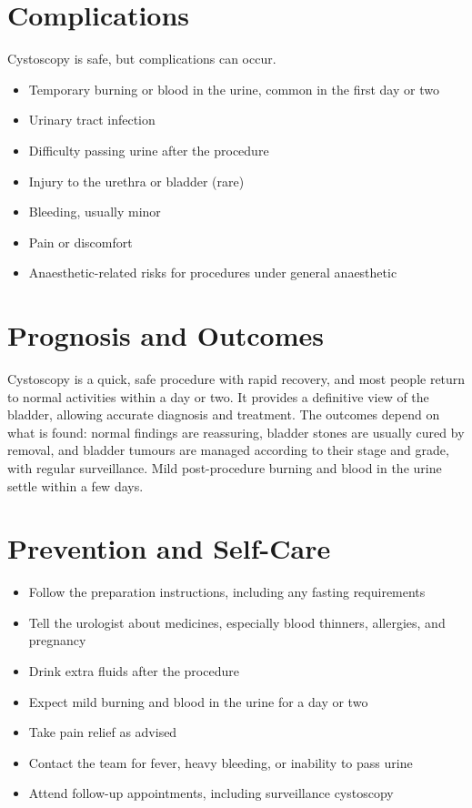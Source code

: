 \section*{Complications}
Cystoscopy is safe, but complications can occur.

\begin{itemize}
    \item Temporary burning or blood in the urine, common in the first day or two
    \item Urinary tract infection
    \item Difficulty passing urine after the procedure
    \item Injury to the urethra or bladder (rare)
    \item Bleeding, usually minor
    \item Pain or discomfort
    \item Anaesthetic-related risks for procedures under general anaesthetic
\end{itemize}

\section*{Prognosis and Outcomes}
Cystoscopy is a quick, safe procedure with rapid recovery, and most people return to normal activities within a day or two. It provides a definitive view of the bladder, allowing accurate diagnosis and treatment. The outcomes depend on what is found: normal findings are reassuring, bladder stones are usually cured by removal, and bladder tumours are managed according to their stage and grade, with regular surveillance. Mild post-procedure burning and blood in the urine settle within a few days.

\section*{Prevention and Self-Care}
\begin{itemize}
    \item Follow the preparation instructions, including any fasting requirements
    \item Tell the urologist about medicines, especially blood thinners, allergies, and pregnancy
    \item Drink extra fluids after the procedure
    \item Expect mild burning and blood in the urine for a day or two
    \item Take pain relief as advised
    \item Contact the team for fever, heavy bleeding, or inability to pass urine
    \item Attend follow-up appointments, including surveillance cystoscopy
\end{itemize}

